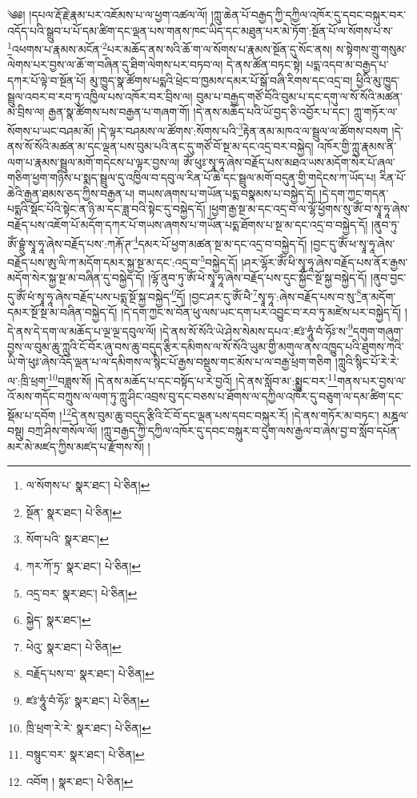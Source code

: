 \setcounter{footnote}{0} 
༄༅། །དཔལ་རྡོ་རྗེ་རྣམ་པར་འཇོམས་པ་ལ་ཕྱག་འཚལ་ལོ། །ཀླུ་ཆེན་པོ་བརྒྱད་ཀྱི་དཀྱིལ་འཁོར་དུ་དབང་བསྐུར་བར་འདོད་པའི་སྒྲུབ་པ་པོ་དམ་ཚིག་དང་ལྡན་པས་གནས་ཁང་ཡིད་དང་མཐུན་པར་མེ་ཏོག་:སྔོན་པོ་ལ་སོགས་པ་ས་\footnote{ལ་སོགས་པ་  སྣར་ཐང་།  པེ་ཅིན། }འཕགས་པ་རྣམས་མངོན་\footnote{སྔོན་  སྣར་ཐང་།  པེ་ཅིན། }པར་མཆོད་ནས་སའི་ཆོ་ག་ལ་སོགས་པ་རྣམས་སྔོན་དུ་སོང་ནས། ས་སྟེགས་གྲུ་གསུམ་ལེགས་པར་བྱས་ལ་ཆོ་ག་བཞིན་དུ་ཐིག་ལེགས་པར་བཏབ་ལ། དེ་ནས་ཚོན་བཏང་སྟེ། པདྨ་འདབ་མ་བརྒྱད་པ་དཀར་པོ་ལྟེ་བ་སྔོན་པོ། མུ་ཁྱུད་སྣ་ཚོགས་པདྨའི་ཕྲེང་བ་ཁྱམས་དམར་པོ་སྒོ་བཞི་རིགས་དང་འདྲ་བ། ཕྱིའི་མུ་ཁྱུད་སྦྲུལ་འབར་བ་རབ་ཏུ་འཁྱིལ་པས་འཁོར་བར་བྲིས་ལ། བུམ་པ་བརྒྱད་གཙོ་བོའི་བུམ་པ་དང་དགུ་ལ་སོ་སོའི་མཚན་མ་བྲིས་ལ། རྒྱན་སྣ་ཚོགས་པས་བརྒྱན་པ་གཞག་གོ། །དེ་ནས་མཆོད་པའི་ཡོ་བྱད་ཅི་འབྱོར་པ་དང་། ཀླུ་གཏོར་ལ་སོགས་པ་ཡང་བཤམ་མོ། །དེ་ལྟར་བཤམས་ལ་ཚོགས་:སོགས་པའི་\footnote{སོག་པའི་  སྣར་ཐང་། }རྟེན་ནམ་མཁའ་ལ་སྦྲུལ་ལ་ཚོགས་བསག །དེ་ནས་སོ་སོའི་མཚན་མ་དང་ལྡན་པས་བུམ་པའི་ནང་དུ་གཙོ་བོ་སྔ་མ་དང་འདྲ་བར་བསྐྱེད། འཁོར་གྱི་ཀླུ་རྣམས་ནི་ལག་པ་རྣམས་སྦྲུལ་མགོ་གདེངས་པ་ལྟར་བྱས་ལ། ཨོཾ་ཕུཿ་སྭཱ་ཧཱ་ཞེས་བརྗོད་པས་མཐའ་ཡས་མདོག་སེར་པོ་ཞལ་གཅིག་ཕྱག་གཉིས་པ་སྨད་སྦྲུལ་དུ་འཁྱིལ་བ་དབུ་ལ་རིན་པོ་ཆེ་དང་སྦྲུལ་མགོ་བདུན་གྱི་གདེངས་ཀ་ཡོད་པ། རིན་པོ་ཆེའི་རྒྱན་ཐམས་ཅད་ཀྱིས་བརྒྱན་པ། གཡས་ཞགས་པ་གཡོན་པདྨ་བསྣམས་པ་བསྐྱེད་དོ། །དེ་དག་ཀྱང་གདན་པདྨའི་སྡོང་པོའི་སྟེང་ན་ཉི་མ་དང་ཟླ་བའི་སྟེང་དུ་བསྐྱེད་དོ། །ཕྱག་རྒྱ་སྔ་མ་དང་འདྲ་བ་ལ་ལྷོ་ཕྱོགས་སུ་ཨོཾ་བ་སྭཱ་ཧཱ་ཞེས་བརྗོད་པས་འཇོག་པོ་མདོག་དཀར་པོ་གཡས་ཞགས་པ་གཡོན་པདྨ་ཐོགས་པ་སྔ་མ་དང་འདྲ་བ་བསྐྱེད་དོ། །ནུབ་ཏུ་ཨོཾ་བྷྲུཾ་སྭཱ་ཧཱ་ཞེས་བརྗོད་པས་:ཀརྐོ་ཊ་\footnote{ཀར་ཀོ་ཏྲ་  སྣར་ཐང་།  པེ་ཅིན། }དམར་པོ་ཕྱག་མཚན་སྔ་མ་དང་འདྲ་བ་བསྐྱེད་དོ། །བྱང་དུ་ཨོཾ་ཕ་སྭཱ་ཧཱ་ཞེས་བརྗོད་པས་ཨུ་ལི་ཀ་མདོག་དམར་སྐྱ་སྔ་མ་དང་:འདྲ་བ་\footnote{འདྲ་བར་  སྣར་ཐང་།  པེ་ཅིན། }བསྐྱེད་དོ། །ཤར་ལྷོར་ཨོཾ་ཕི་སྭཱ་ཧཱ་ཞེས་བརྗོད་པས་ནོར་རྒྱས་མདོག་སེར་སྐྱ་སྔ་མ་བཞིན་དུ་བསྐྱེད་དོ། །ལྷོ་ནུབ་ཏུ་ཨོཾ་ཕེ་སྭཱ་ཧཱ་ཞེས་བརྗོད་པས་དུང་སྐྱོང་སྔོ་སྐྱ་བསྐྱེད་དོ། །ནུབ་བྱང་དུ་ཨོཾ་ཕཾ་སྭཱ་ཧཱ་ཞེས་བརྗོད་པས་པདྨ་སྔོ་སྐྱ་བསྐྱེད་\footnote{སྐྱེད་  སྣར་ཐང་། }དོ། །བྱང་ཤར་དུ་ཨོཾ་ཕཻ་\footnote{ཕེའུ་  སྣར་ཐང་།  པེ་ཅིན། }སྭཱ་ཧཱ་:ཞེས་བརྗོད་པས་བ་སུ་\footnote{བརྗོད་པས་བ་  སྣར་ཐང་།  པེ་ཅིན། }ན་མདོག་དམར་སྔོ་སྔ་མ་བཞིན་བསྐྱེད་དོ། །དེ་དག་ཀྱང་ས་བོན་ཕུ་ལས་ཡང་དག་པར་འབྱུང་བ་རབ་ཏུ་མཛེས་པར་བསྐྱེད་དོ། །དེ་ནས་དེ་དག་ལ་མཆོད་པ་ལྔ་ལྔ་དབུལ་ལོ། །དེ་ནས་སོ་སོའི་ཡེ་ཤེས་སེམས་དཔའ་:ཛཿ་ཧཱུཾ་བཾ་ཧོཿ་ས་\footnote{ཛཿ་ཧཱུཾ་བཾ་ཧོཿ་  སྣར་ཐང་།  པེ་ཅིན། }དགུག་གཞུག་བྱས་ལ་བུམ་ཆུ་ཀླུའི་ངོ་བོར་ཞུ་བས་ཆུ་བདུད་རྩིར་དམིགས་ལ་སོ་སོའི་ཡུམ་གྱི་མགུལ་ནས་འཁྱུད་པའི་ཐུགས་ཀའི་ཡི་གེ་ཕུཿ་ཞེས་འོད་ལྡན་པ་ལ་དམིགས་ལ་སྙིང་པོ་རྒྱས་བསྡུས་གང་མོས་པ་ལ་བརྒྱ་ཕྲག་གཅིག །ཀླུའི་སྙིང་པོ་རེ་རེ་ལ་:ཁྲི་ཕྲག་\footnote{ཁྲི་ཕྲག་རེ་རེ་  སྣར་ཐང་།  པེ་ཅིན། }བཟླས་སོ། །དེ་ནས་མཆོད་པ་དང་བསྟོད་པ་རེ་བྱའོ། །དེ་ནས་སློབ་མ་:སྨྱུང་བར་\footnote{བསྙུང་བར་  སྣར་ཐང་།  པེ་ཅིན། }གནས་པར་བྱས་ལ་འོ་མས་གདོང་བཀྲུས་ལ་ལག་ཏུ་ཀླུ་ཤིང་འབྲས་བུ་དང་བཅས་པ་ཐོགས་ལ་དཀྱིལ་འཁོར་དུ་བཅུག་ལ་དམ་ཚིག་དང་སྡོམ་པ་དབོག །\footnote{འབོག །  སྣར་ཐང་།  པེ་ཅིན། }དེ་ནས་བུམ་ཆུ་བདུད་རྩིའི་ངོ་བོ་དང་ལྡན་པས་དབང་བསྐུར་རོ། །དེ་ནས་གཏོར་མ་བཏང་། མཎྜལ་བསྡུ། བཀྲ་ཤིས་གསོལ་ལོ། །ཀླུ་བརྒྱད་ཀྱི་དཀྱིལ་འཁོར་དུ་དབང་བསྐུར་བ་དུག་ལས་རྒྱལ་བ་ཞེས་བྱ་བ་སློབ་དཔོན་མར་མེ་མཛད་ཀྱིས་མཛད་པ་རྫོགས་སོ། ། 